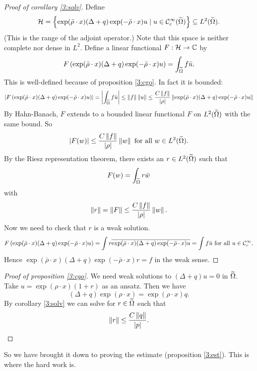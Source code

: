 \begin{proof}[Proof of corollary \ref{3:solv}]
  Define
  \[ \mathcal{H} = \left\{ \exp(\bar\rho \cdot x)(\Delta+q)\exp(-\bar\rho\cdot x)u \mid u \in \mathcal{C}_c^\infty(\widetilde\Omega) \right\} \subseteq L^2(\widetilde\Omega). \]
  (This is the range of the adjoint operator.)
  Note that this space is neither complete nor dense in $L^2$.
  Define a linear functional $F: \mathcal{H} \to \mathbb{C}$ by
  \[ F\left( \exp(\bar\rho \cdot x)(\Delta+q)\exp(-\bar\rho\cdot x)u \right) = \int_{\widetilde\Omega} f \bar u. \]
  This is well-defined because of proposition \ref{3:cgo}.
  In fact it is bounded:
  \[ \left\lvert  F\left( \exp(\bar\rho \cdot x)(\Delta+q)\exp(-\bar\rho\cdot x)u \right)  \right\rvert = \left\lvert  \int_{\widetilde\Omega} f \bar u  \right\rvert \leq \left\lVert f \right\rVert\left\lVert u \right\rVert \leq \frac{C\left\lVert f \right\rVert}{\left\lvert \rho \right\rvert} \left\lVert \exp(\bar\rho \cdot x)(\Delta+q)\exp(-\bar\rho\cdot x)u \right\rVert \]
  By Hahn-Banach, $F$ extends to a bounded linear functional $F$ on $L^2(\widetilde\Omega)$ with the same bound.
  So
  \[ \left\lvert F(w) \right\rvert \leq \frac{C\left\lVert f \right\rVert}{\left\lvert \rho \right\rvert}\left\lVert w \right\rVert \text{ for all } w \in L^2(\widetilde\Omega). \]
  By the Riesz representation theorem, there exists an $r \in L^2(\widetilde\Omega)$ such that
  \[ F(w) = \int_{\widetilde\Omega} r\bar w \]
  with
  \[ \left\lVert r \right\rVert = \left\lVert F \right\rVert \leq \frac{C\left\lVert f \right\rVert}{\left\lvert \rho \right\rvert}\left\lVert w \right\rVert. \]
  Now we need to check that $r$ is a weak solution.
  \[ F \left( \exp(\bar\rho \cdot x)(\Delta+q)\exp(-\bar\rho\cdot x)u \right) = \int r \overline{ \exp(\bar\rho \cdot x)(\Delta+q)\exp(-\bar\rho\cdot x)u } = \int f\bar u \text{ for all } u \in \mathcal{C}_c^\infty. \]
  Hence $\exp(\bar\rho \cdot x)(\Delta+q)\exp(-\bar\rho\cdot x)r = f$ in the weak sense.
\end{proof}

\begin{proof}[Proof of proposition \ref{3:cgo}]
  We need weak solutions to $(\Delta+q)u=0$ in $\widetilde\Omega$.
  Take $u=\exp(\rho\cdot x)(1+r)$ as an ansatz.
  Then we have
  \[ (\Delta+q)\exp(\rho\cdot x) = \exp(\rho\cdot x)q. \]
  By corollary \ref{3:solv} we can solve for $r \in \widetilde\Omega$ such that
  \[ \left\lVert r \right\rVert \leq \frac{C\left\lVert q \right\rVert}{\left\lvert p \right\rvert}. \qedhere \]
\end{proof}

So we have brought it down to proving the estimate (proposition \ref{3:est}).
This is where the hard work is.
